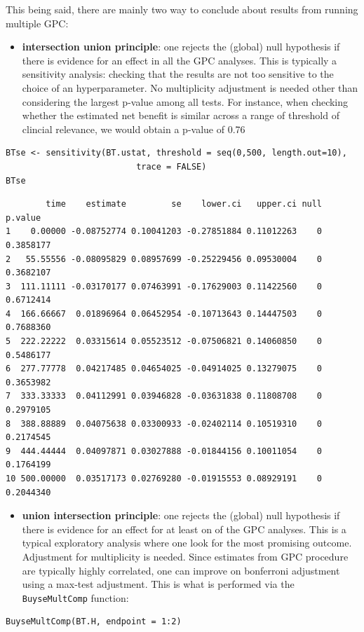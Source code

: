 \documentclass[12pt]{article}
\begin{document}
\bigskip

This being said, there are mainly two way to conclude about results
from running multiple GPC:
\begin{itemize}
\item \textbf{intersection union principle}: one rejects the (global) null
hypothesis if there is evidence for an effect in all the GPC
analyses. This is typically a sensitivity analysis: checking that
the results are not too sensitive to the choice of an
hyperparameter. No multiplicity adjustment is needed other than
considering the largest p-value among all tests. For instance, when
checking whether the estimated net benefit is similar across a range
of threshold of clincial relevance, we would obtain a p-value of
0.76
\end{itemize}
\lstset{language=r,label= ,caption= ,captionpos=b,numbers=none}
\begin{lstlisting}
BTse <- sensitivity(BT.ustat, threshold = seq(0,500, length.out=10),
                          trace = FALSE)
BTse
\end{lstlisting}

\begin{verbatim}
        time    estimate         se    lower.ci   upper.ci null   p.value
1    0.00000 -0.08752774 0.10041203 -0.27851884 0.11012263    0 0.3858177
2   55.55556 -0.08095829 0.08957699 -0.25229456 0.09530004    0 0.3682107
3  111.11111 -0.03170177 0.07463991 -0.17629003 0.11422560    0 0.6712414
4  166.66667  0.01896964 0.06452954 -0.10713643 0.14447503    0 0.7688360
5  222.22222  0.03315614 0.05523512 -0.07506821 0.14060850    0 0.5486177
6  277.77778  0.04217485 0.04654025 -0.04914025 0.13279075    0 0.3653982
7  333.33333  0.04112991 0.03946828 -0.03631838 0.11808708    0 0.2979105
8  388.88889  0.04075638 0.03300933 -0.02402114 0.10519310    0 0.2174545
9  444.44444  0.04097871 0.03027888 -0.01844156 0.10011054    0 0.1764199
10 500.00000  0.03517173 0.02769280 -0.01915553 0.08929191    0 0.2044340
\end{verbatim}
\begin{itemize}
\item \textbf{union intersection principle}: one rejects the (global) null
hypothesis if there is evidence for an effect for at least on of the
GPC analyses. This is a typical exploratory analysis where one look
for the most promising outcome. Adjustment for multiplicity is
needed.  Since estimates from GPC procedure are typically highly
correlated, one can improve on bonferroni adjustment using a
max-test adjustment. This is what is performed via the
\texttt{BuyseMultComp} function:
\end{itemize}
\lstset{language=r,label= ,caption= ,captionpos=b,numbers=none}
\begin{lstlisting}
BuyseMultComp(BT.H, endpoint = 1:2)
\end{lstlisting}
\end{document}
